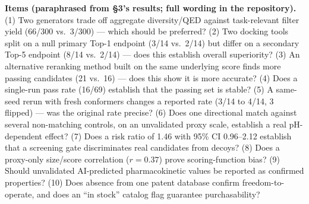 \documentclass{article}
\begin{document}
\textbf{Items (paraphrased from \S3's results; full wording in the repository).} (1) Two generators trade off aggregate diversity/QED against task-relevant filter yield (66/300 vs.\ 3/300) --- which should be preferred? (2) Two docking tools split on a null primary Top-1 endpoint (3/14 vs.\ 2/14) but differ on a secondary Top-5 endpoint (8/14 vs.\ 2/14) --- does this establish overall superiority? (3) An alternative reranking method built on the same underlying score finds more passing candidates (21 vs.\ 16) --- does this show it is more accurate? (4) Does a single-run pass rate (16/69) establish that the passing set is stable? (5) A same-seed rerun with fresh conformers changes a reported rate (3/14 to 4/14, 3 flipped) --- was the original rate precise? (6) Does one directional match against several non-matching controls, on an unvalidated proxy scale, establish a real pH-dependent effect? (7) Does a risk ratio of 1.46 with 95\% CI 0.96--2.12 establish that a screening gate discriminates real candidates from decoys? (8) Does a proxy-only size/score correlation ($r=0.37$) prove scoring-function bias? (9) Should unvalidated AI-predicted pharmacokinetic values be reported as confirmed properties? (10) Does absence from one patent database confirm freedom-to-operate, and does an ``in stock'' catalog flag guarantee purchasability?
\end{document}
